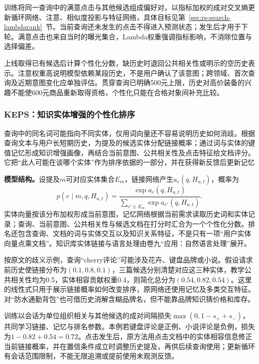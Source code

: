 训练将同一查询中的满意点击与其他候选组成偏好对，以指标加权的成对交叉熵更新循环网络、注意、相似度投影与特征网络，具体目标见第~\ref{sec:rs-search-lambdarank}~节。当前查询还未发生的点击不得进入预测状态；发生后才用于下轮。满意点击也来自当时的曝光集合，Lambda权重强调指标影响，不消除位置与选择偏差。

上线取得已有候选后计算个性化分数，缺历史时退回公共相关性或明示的空历史表示。注意权重高说明模型依赖某段历史，不是用户确认了该意图；跨领域、首次查询及近期意图变化应单独评估。贯穿查询已明确500元上限，历史对高价装备的兴趣不能使600元商品重新取得资格，个性化只能在合格对象间补充比较。

\Needspace{100mm}
\subsubsection{KEPS：知识实体增强的个性化排序}
\label{sec:rs-search-keps}

查询中的同名词可能指向不同实体，仅用词向量还不容易说明历史如何消歧。根据查询文本与用户长短期历史，为提及的候选实体分配链接概率；通过词与实体的键值记忆形成知识增强画像，再结合当前意图、公共相关性及点击特征给文档评分。它把“此人可能在谈哪个实体”作为排序依据的一部分，并在获得新反馈后更新记忆

\textbf{模型结构。}设提及$m$可对应实体集合$E_m$，链接网络产生$a_e(q,H_{u,t})$，概率为
\begin{equation}
 p(e\mid m,q,H_{u,t})=
 \frac{\exp a_e(q,H_{u,t})}{\sum_{e'\in E_m}\exp a_{e'}(q,H_{u,t})}.
 \label{eq:rs-search-keps-linking}
\end{equation}
实体向量按该分布加权形成当前意图，记忆网络根据当前需求读取历史词和实体记录；查询、当前意图、公共相关性与候选文档在打分时汇合为一个个性化分数。排名还包含查询、文档的词与实体交互以及知识关系特征，不是只有一项“用户实体向量点乘文档”。知识库实体链接与语言处理由卷九“应用：自然语言处理”展开。

按原文的歧义示例，查询“cherry评论”可能涉及花卉、键盘品牌或小说。假设请求前历史使链接分布为$(0.1,0.8,0.1)$，三篇候选分别清楚对应这三种实体，教学公共相关性均为0.5，实体相容贡献权重0.4，则简化总分为$(0.54,0.82,0.54)$。这里的线性式只用于展示链接概率如何改变排序，原网络还使用记忆及多类交互特征。对“防水通勤背包”也可借历史消解含糊品牌名，但不能靠品牌知识猜价格和库存。

训练以会话为单位组织相关与其他候选的成对间隔损失$\max(0,1-s_++s_-)$，共同学习链接、记忆与排名参数。本例若键盘评论是正例、小说评论是负例，损失为$1-0.82+0.54=0.72$。点击发生后，原方法用点击文档中的实体相容信息修正当前链接概率，并在置信条件成立时调整历史提及，再供后续查询使用；更新循环有会话范围限制，不能无限追溯或提前使用未观测反馈。

